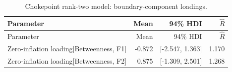 \documentclass[pdftex,12pt,openright,a4paper,oneside]{book}
\begin{document}
\begin{longtable}{@{}p{}rrr@{}}

\caption{Chokepoint rank-two model: boundary-component loadings.}\label{tab:chokepoint_rank2_419}\\

\toprule

Parameter & Mean & 94\% HDI & $\widehat R$ \\

\midrule\endfirsthead

\toprule

Parameter & Mean & 94\% HDI & $\widehat R$ \\

\midrule\endhead

Zero-inflation loading[Betweenness, F1] & -0.872 & [-2.547, 1.363] & 1.170 \\

Zero-inflation loading[Betweenness, F2] & 0.875 & [-1.309, 2.501] & 1.268 \\

\bottomrule\end{longtable}
\end{document}
